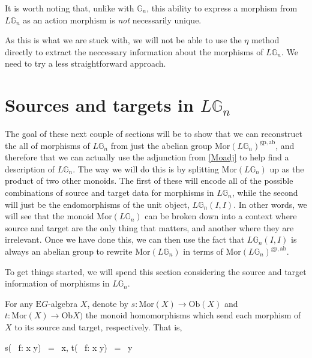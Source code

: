 It is worth noting that, unlike with $\mathbb{G}_n$, this ability to express a morphism from $L\mathbb{G}_n$ as an action morphism is \emph{not} necessarily unique.













As this is what we are stuck with, we will not be able to use the $\eta$ method directly to extract the neccessary information about the morphisms of $L\mathbb{G}_n$. We need to try a less straightforward approach.

\section{Sources and targets in $L\mathbb{G}_n$}  

The goal of these next couple of sections will be to show that we can reconstruct the all of morphisms of $L\mathbb{G}_n$ from just the abelian group $\mathrm{Mor}(L\mathbb{G}_n)^{\mathrm{gp, ab}}$, and therefore that we can actually use the adjunction from \cref{Moadj} to help find a description of $L\mathbb{G}_n$. The way we will do this is by splitting $\mathrm{Mor}(L\mathbb{G}_n)$ up as the product of two other monoids. The first of these will encode all of the possible combinations of source and target data for morphisms in $L\mathbb{G}_n$, while the second will just be the endomorphisms of the unit object, $L\mathbb{G}_n(I, I)$. In other words, we will see that the monoid $\mathrm{Mor}(L\mathbb{G}_n)$ can be broken down into a context where source and target are the only thing that matters, and another where they are irrelevant. Once we have done this, we can then use the fact that $L\mathbb{G}_n(I, I)$ is always an abelian group to rewrite $\mathrm{Mor}(L\mathbb{G}_n)$ in terms of $\mathrm{Mor}(L\mathbb{G}_n)^{\mathrm{gp, ab}}$.

To get things started, we will spend this section considering the source and target information of morphisms in $L\mathbb{G}_n$.

\begin{defn} For any $\mathrm{E}G$-algebra $X$, denote by $s: \mathrm{Mor}(X) \to \mathrm{Ob}(X)$ and $t: \mathrm{Mor}(X) \to \mathrm{Ob}X)$ the monoid homomorphisms which send each morphism of $X$ to its source and target, respectively. That is,
\begin{eq*} s( \, f: x \to y) \, = \, x, \quad \quad t( \, f: x \to y) \, = \, y \end{eq*}
\end{defn}

